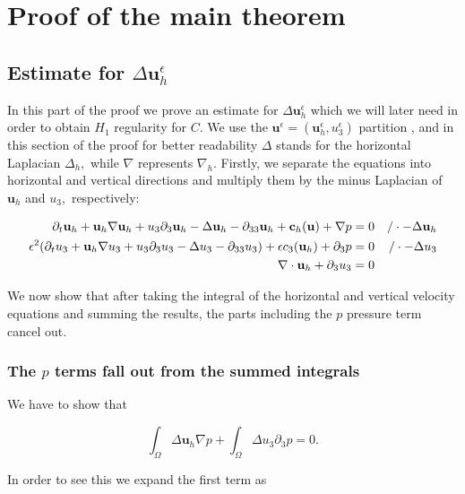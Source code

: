 \documentclass[11pt]{article}
\begin{document}
\section{Proof of the main theorem} \label{proof}

\subsection{Estimate for $\Delta \mathbf{u}^\epsilon_h$}

In this part of the proof we prove an estimate for $\Delta \mathbf{u}^\epsilon_h$ which we will later need in order to obtain $H_1$ regularity for $C$. We use the $\mathbf{u}^\epsilon = (\mathbf{u}^\epsilon_h, u^\epsilon_3)$ partition , and in this section of the proof for better readability $\Delta$ stands for the horizontal Laplacian $\Delta_h,$ while $\nabla$ represents $\nabla_h.$
Firstly, we separate the equations into horizontal and vertical directions and multiply them by the minus Laplacian of $\mathbf{u}_h$ and $u_3,$ respectively:

\begin{align}
\partial_t \mathbf{u}_h + \mathbf{u}_h \nabla \mathbf{u}_h + u_3 \partial_3 \mathbf{u}_h - \Delta \mathbf{u}_h - \partial_{33} \mathbf{u}_h + \mathbf{c}_h (\mathbf{u}) + \nabla p& = 0 & / \cdot - \Delta \mathbf{u}_h  \notag\\
\epsilon^2 (\partial_t u_3 + \mathbf{u}_h \nabla u_3 + u_3 \partial_3 u_3 - \Delta u_3 -\partial_{33} u_3) + \epsilon c_3 (\mathbf{u}_h) + \partial_3 p & = 0 & / \cdot - \Delta u_3 \notag \\
\nabla \cdot \mathbf{u}_h + \partial_3 u_3 & = 0 & \label{nulldivexpand}
\end{align}

We now show that after taking the integral of the horizontal and vertical velocity equations and summing the results, the parts including the $p$ pressure term cancel out.

\subsubsection{The $p$ terms fall out from the summed integrals}

We have to show that

\[ \int_\Omega \Delta \mathbf{u}_h \nabla p + \int_\Omega \Delta u_3 \partial_3 p = 0. \]

In order to see this we expand the first term as
\end{document}
